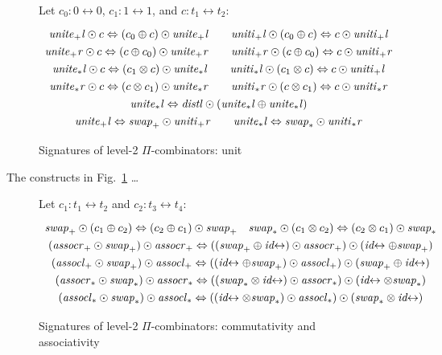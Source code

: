 \documentclass{article}
\newcommand{\identlp}{\mathit{unite}_+\mathit{l}}
\newcommand{\identrp}{\mathit{uniti}_+\mathit{l}}
\newcommand{\identlsp}{\mathit{unite}_+\mathit{r}}
\newcommand{\identrsp}{\mathit{uniti}_+\mathit{r}}
\newcommand{\swapp}{\mathit{swap}_+}
\newcommand{\assoclp}{\mathit{assocl}_+}
\newcommand{\assocrp}{\mathit{assocr}_+}
\newcommand{\identlt}{\mathit{unite}_*\mathit{l}}
\newcommand{\identrt}{\mathit{uniti}_*\mathit{l}}
\newcommand{\identlst}{\mathit{unite}_*\mathit{r}}
\newcommand{\identrst}{\mathit{uniti}_*\mathit{r}}
\newcommand{\swapt}{\mathit{swap}_*}
\newcommand{\assoclt}{\mathit{assocl}_*}
\newcommand{\assocrt}{\mathit{assocr}_*}
\newcommand{\distl}{\mathit{distl}}
\newcommand{\idc}{\mathit{id}\!\!\leftrightarrow}
\begin{document}
\begin{center}
\begin{tikzpicture}[scale=0.7,every node/.style={scale=0.8}]
\end{tikzpicture}
\end{center}

\begin{figure}[tb]
Let $c_0 : 0 \leftrightarrow 0$, $c_1 : 1 \leftrightarrow 1$, and $c : t_1 \leftrightarrow t_2$:
\[\def\arraystretch{1.3}
\begin{array}{c}
  {\identlp \odot c \Leftrightarrow (c_0 \oplus c) \odot \identlp}
\qquad
  {\identrp \odot (c_0 \oplus c) \Leftrightarrow c \odot \identrp}
\\
  {\identlsp \odot c \Leftrightarrow (c \oplus c_0) \odot \identlsp}
\qquad
  {\identrsp \odot (c \oplus c_0) \Leftrightarrow c \odot \identrsp}
\\
  {\identlt \odot c \Leftrightarrow (c_1 \otimes c) \odot \identlt}
\qquad
  {\identrt \odot (c_1 \otimes c) \Leftrightarrow c \odot \identrp}
\\
  {\identlst \odot c \Leftrightarrow (c \otimes c_1) \odot \identlst}
\qquad
  {\identrst \odot (c \otimes c_1) \Leftrightarrow c \odot \identrst}
\\
  {\identlt \Leftrightarrow \distl \odot (\identlt \oplus \identlt)}
\\
\identlp \Leftrightarrow \swapp \odot \identrsp
\qquad
\identlt \Leftrightarrow \swapt \odot \identrst
\end{array}\]
\caption{\label{figg}Signatures of level-2 $\Pi$-combinators: unit}
\end{figure}

The constructs in Fig.~\ref{figg} \ldots 
\begin{center}
\begin{tikzpicture}[scale=0.7,every node/.style={scale=0.8}]
\end{tikzpicture}
\end{center}

\begin{figure}[tb]
Let $c_1 : t_1 \leftrightarrow t_2$ and $c_2 : t_3 \leftrightarrow t_4$:
\[\def\arraystretch{1.3}
\begin{array}{c}
  {\swapp \odot (c_1 \oplus c_2) \Leftrightarrow (c_2 \oplus c_1) \odot \swapp}
\quad
  {\swapt \odot (c_1 \otimes c_2) \Leftrightarrow (c_2 \otimes c_1) \odot \swapt}
\\
  {(\assocrp \odot \swapp) \odot \assocrp \Leftrightarrow ((\swapp \oplus \idc) \odot \assocrp) \odot (\idc \oplus \swapp)}
\\
  {(\assoclp \odot \swapp) \odot \assoclp \Leftrightarrow ((\idc \oplus \swapp) \odot \assoclp) \odot (\swapp \oplus \idc)}
\\
  {(\assocrt \odot \swapt) \odot \assocrt \Leftrightarrow ((\swapt \otimes \idc) \odot \assocrt) \odot (\idc \otimes \swapt)}
\\
  {(\assoclt \odot \swapt) \odot \assoclt \Leftrightarrow ((\idc \otimes \swapt) \odot \assoclt) \odot (\swapt \otimes \idc)}
\end{array}\]
\caption{\label{figf}Signatures of level-2 $\Pi$-combinators: commutativity and associativity}
\end{figure}
\end{document}

